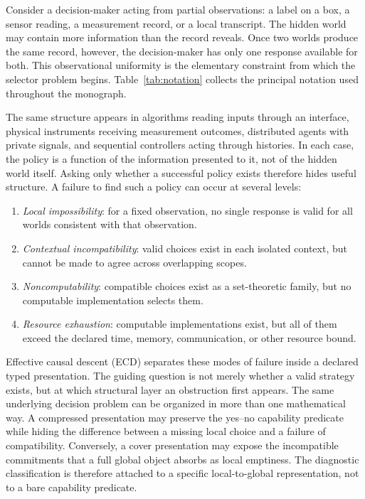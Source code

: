 \documentclass[11pt]{article}
\theoremstyle{plain}
\theoremstyle{definition}
\theoremstyle{remark}
\begin{document}
Consider a decision-maker acting from partial observations: a label on a box, a
sensor reading, a measurement record, or a local transcript. The hidden world may
contain more information than the record reveals. Once two worlds produce the
same record, however, the decision-maker has only one response available for
both. This observational uniformity is the elementary constraint from which the
selector problem begins. Table~\ref{tab:notation} collects the principal
notation used throughout the monograph.

The same structure appears in algorithms reading inputs through an interface,
physical instruments receiving measurement outcomes, distributed agents with
private signals, and sequential controllers acting through histories. In each
case, the policy is a function of the information presented to it, not of the
hidden world itself. Asking only whether a successful policy exists therefore
hides useful structure. A failure to find such a policy can occur at several
levels:
\begin{enumerate}[label=(\roman*)]
\item \emph{Local impossibility}: for a fixed observation, no single response is
valid for all worlds consistent with that observation.
\item \emph{Contextual incompatibility}: valid choices exist in each isolated
context, but cannot be made to agree across overlapping scopes.
\item \emph{Noncomputability}: compatible choices exist as a set-theoretic
family, but no computable implementation selects them.
\item \emph{Resource exhaustion}: computable implementations exist, but all of
them exceed the declared time, memory, communication, or other resource bound.
\end{enumerate}

Effective causal descent (ECD) separates these modes of failure inside a
declared typed presentation. The guiding question is not merely whether a valid
strategy exists, but at which structural layer an obstruction first appears. The
same underlying decision problem can be organized in more than one mathematical
way. A compressed presentation may preserve the yes--no capability predicate
while hiding the difference between a missing local choice and a failure of
compatibility. Conversely, a cover presentation may expose the incompatible
commitments that a full global object absorbs as local emptiness. The diagnostic
classification is therefore attached to a specific local-to-global
representation, not to a bare capability predicate.
\end{document}

